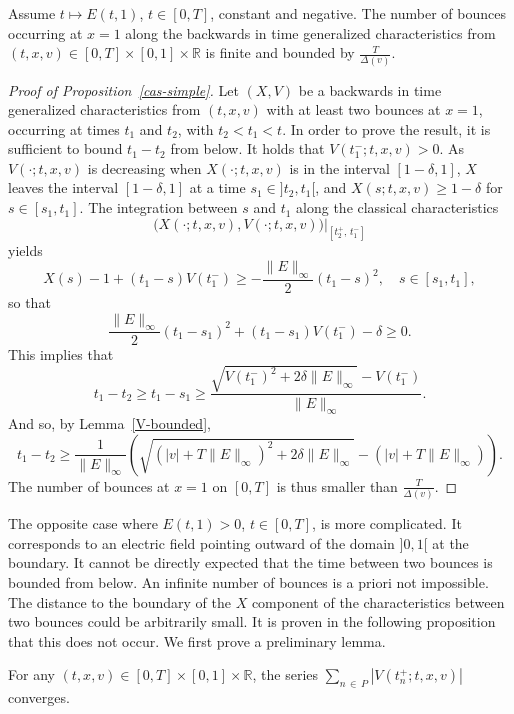 \documentclass[AHL,Unicode,longabstracts,published]{cedram}
\newcommand{\R}{\mathbb{R}}
\begin{document}
\begin{prop}\label{cas-simple}
Assume $t \mapsto E(t,1)$, $t \in [0,T]$, constant and negative. 
The number of bounces occurring at $x=1$ along the backwards in time generalized characteristics from $(t,x,v)\in [0,T] \times [0,1] \times \R $ is finite and bounded by $\frac{T}{\Delta(v)}$.
\end{prop}


\begin{proof}[{Proof of Proposition~\ref{cas-simple}}]
Let $(X,V)$ be a backwards in time generalized characteristics from $(t,x,v)$ with at least two bounces at $x=1$, occurring at times $t_1$ and $t_2$, with $t_2<t_1<t$. In order to prove the result, it is sufficient to bound $t_1-t_2$ from below.
It holds that $V(t_1^-;t,x,v)>0$. As $V(\cdot;t,x,v)$ is decreasing when $X(\cdot;t,x,v)$ is in the interval $[1-\delta,1]$, $X$ leaves the interval $[1-\delta,1]$ at a time $s_1\in]t_2,t_1[$, and $X(s;t,x,v) \geq 1-\delta$ for $s \in [s_1,t_1]$. The integration between $s$ and $t_1$ along the classical characteristics
\[
\big(X(\cdot ;t,x,v),V(\cdot ;t,x,v)\big)\big |_{\left[t_2^+,\,t_1^-\right]}
\]
yields
\[
X(s) - 1 + \left(t_1-s\right) V\left(t_1^-\right) \geq -\frac{\|E\|_{\infty }}{2} \left(t_1-s\right)^2, \quad s \in \left[s_1, t_1\right],
\]
so that
\[
\frac{\|E\|_{\infty }}{2} \left(t_1-s_1\right)^2 + \left(t_1 - s_1\right) V\left(t_1^-\right) - \delta \geq 0.
\]
This implies that
\[
t_1-t_2 \geq t_1 - s_1 \geq \frac{\sqrt{V\left(t_1^-\right)^2 + 2 \delta \|E\|_{\infty }}-V\left(t_1^-\right)}{\|E\|_{\infty }}.
\]
And so, by Lemma~\ref{V-bounded},
\[
t_1-t_2 \geq \frac{1}{\|E\|_{\infty }} \left (\sqrt{ \left (|v| + T \|E\|_{\infty } \right)^2 +2\delta \|E\|_{\infty } } - \left (|v| + T \|E\|_{\infty } \right)\right).
\]
The number of bounces at $x=1$ on $[0,T]$ is thus smaller than $\frac{T}{\Delta(v)}$.
\end{proof}

The opposite case where $E(t,1)>0$, $t\in [0,T]$, is more complicated. It corresponds to an electric field pointing outward of the domain $]0,1[$ at the boundary. It cannot be directly expected that the time between two bounces is bounded from below. An infinite number of bounces is a priori not impossible. The distance to the boundary of the $X$ component of the characteristics between two bounces could be arbitrarily small. It is proven in the following proposition that this does not occur. We first prove a preliminary lemma.

\begin{lemm}\label{convergent_series}
For any $(t,x,v)\in [0,T] \times [0,1] \times \R $, the series $\sum_{n\,\in\,P} |V(t_n^+;t,x,v)|$ converges.
\end{lemm}
\end{document}
